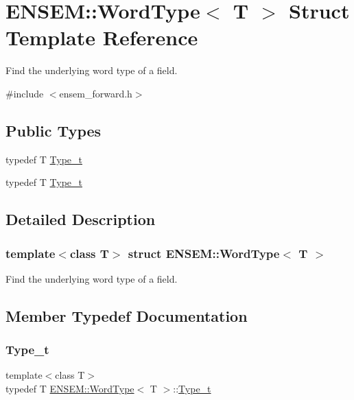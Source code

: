 \hypertarget{structENSEM_1_1WordType}{}\section{E\+N\+S\+EM\+:\+:Word\+Type$<$ T $>$ Struct Template Reference}
\label{structENSEM_1_1WordType}


Find the underlying word type of a field.  




{\ttfamily \#include $<$ensem\+\_\+forward.\+h$>$}

\subsection*{Public Types}
\begin{DoxyCompactItemize}
\item 
typedef T \mbox{\hyperlink{structENSEM_1_1WordType_a81392e736486edab6c96af6198ab8337}{Type\+\_\+t}}
\item 
typedef T \mbox{\hyperlink{structENSEM_1_1WordType_a81392e736486edab6c96af6198ab8337}{Type\+\_\+t}}
\end{DoxyCompactItemize}


\subsection{Detailed Description}
\subsubsection*{template$<$class T$>$\newline
struct E\+N\+S\+E\+M\+::\+Word\+Type$<$ T $>$}

Find the underlying word type of a field. 

\subsection{Member Typedef Documentation}
\mbox{\label{structENSEM_1_1WordType_a81392e736486edab6c96af6198ab8337}} 
\subsubsection{\texorpdfstring{Type\_t}{Type\_t}\hspace{0.1cm}{\footnotesize\ttfamily [1/2]}}
{\footnotesize\ttfamily template$<$class T$>$ \\
typedef T \mbox{\hyperlink{structENSEM_1_1WordType}{E\+N\+S\+E\+M\+::\+Word\+Type}}$<$ T $>$\+::\mbox{\hyperlink{structENSEM_1_1WordType_a81392e736486edab6c96af6198ab8337}{Type\+\_\+t}}}

